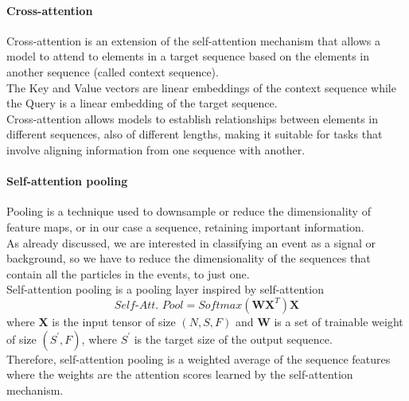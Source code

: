 \paragraph*{Cross-attention}
Cross-attention is an extension of the self-attention mechanism that allows a model to attend to elements in a target sequence based on the elements in another sequence (called context sequence).\\
The Key and Value vectors are linear embeddings of the context sequence while the Query is a linear embedding of the target sequence.\\
Cross-attention allows models to establish relationships between elements in different sequences, also of different lengths, making it suitable for tasks that involve aligning information from one sequence with another.

\paragraph*{Self-attention pooling}


Pooling is a technique used to downsample or reduce the dimensionality of feature maps, or in our case a sequence, retaining important information.\\
As already discussed, we are interested in classifying an event as a signal or background, so we have to reduce the dimensionality of the sequences that contain all the particles in the events, to just one.\\
Self-attention pooling \cite{Safari2020Self-attentionRecognition} is a pooling layer inspired by self-attention
\begin{equation}
    \textit{Self-Att. Pool}=\textit{Softmax}(\bm{W} \bm{X}^T)\bm{X}
\end{equation}
where $\bm{X}$ is the input tensor of size $(N,S,F)$ and $\bm{W}$ is a set of trainable weight of size $(S^{'},F)$, where $S^{'}$ is the target size of the output sequence.\\
Therefore, self-attention pooling is a weighted average of the sequence features where the weights are the attention scores learned by the self-attention mechanism.














